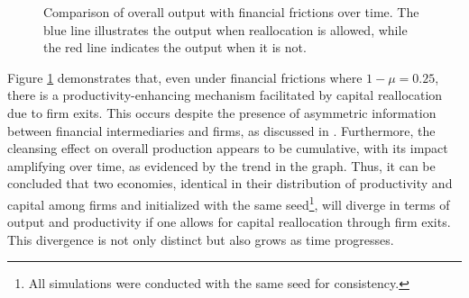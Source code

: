 \documentclass[12pt]{report}
\begin{document}
\begin{figure}[H]
    \centering
    \caption{Comparison of overall output with financial frictions over time. The blue line illustrates the output when
    reallocation  
    is allowed, while the red line indicates the output when it is not.}
    \label{fig:output_comparison_frictions}
\end{figure}
Figure \ref{fig:output_comparison_frictions} demonstrates that, even under financial frictions where \(1- \mu =0.25\),
there is a productivity-enhancing mechanism facilitated by capital reallocation due to firm exits. This occurs despite
the presence of asymmetric information between financial intermediaries and firms, as discussed in \cite{OsePap17}.
Furthermore, the cleansing effect on overall production appears to be cumulative, with its impact amplifying over time,
as evidenced by the trend in the graph. Thus, it can be concluded that two economies, identical in their distribution of
productivity and capital among firms and initialized with the same seed\footnote{All simulations were conducted with the
same seed for consistency.}, will diverge in terms of output and productivity if one allows for capital reallocation
through firm exits. This divergence is not only distinct but also grows as time progresses. 
\medskip

\end{document}
